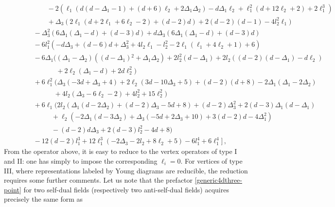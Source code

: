 \documentclass{article}
\begin{document}
\begin{eqnarray*}
&&\qquad \qquad \,\,-2 \left(\ell _1 \left(d \left(d-\Delta _1-1\right)+(d+6) \ell _2+2 \Delta _1 \Delta _2\right)-d \Delta _1 \ell _2+\ell _1^2 \left(d+12 \ell _2+2\right)+2 \ell _1^3\right)\\
&&\qquad \qquad\,\,+\Delta _3 \left(2 \ell _1 \left(d+2 \ell _1+6 \ell _2-2\right)+(d-2) d\right)+2 (d-2) (d-1)-4 l_2^2 \ell _1\bigr)\\
&&\qquad \,\, -\Delta _3^2 \left(6 \Delta _1 \left(\Delta _1-d\right)+(d-3) d\right)+d \Delta _3 \left(6 \Delta _1 \left(\Delta _1-d\right)+(d-3) d\right)\\
&&\qquad\,\, -6 l_1^2 \left(-d \Delta _3+(d-6) d+\Delta _3^2+4 l_2 \ell _1-l_2^2-2 \ell _1 \left(\ell _1+4 \ell _2+1\right)+6\right)\\
&&\qquad\,\,-6 \Delta _1 \bigl(\left(\Delta _1-\Delta _2\right) \left(\left(d-\Delta _1\right){}^2+\Delta _1 \Delta _2\right)+2 l_2^2 \left(d-\Delta _1\right)+2 l_2 \left((d-2) \left(d-\Delta _1\right)-d \ell _2\right)\\
    &&\qquad \qquad\quad\,\,\,\, +2 \ell _2 \left(\Delta _1-d\right)+2 d \ell _2^2\bigr)\\
&&\qquad\,\, +6 \ell _1^2 \bigl(\Delta _3 \left(-3 d+\Delta _3+4\right)+2 \ell _2 \left(3 d-10 \Delta _3+5\right)+(d-2) (d+8)-2 \Delta _1 \left(\Delta _1-2 \Delta _2\right)\\
    &&\qquad\qquad \quad\,\, +4 l_2 \left(\Delta _3-6 \ell _2-2\right)+4 l_2^2+15 \ell _2^2\bigr)\\
&&\qquad\,\, +6 \ell _1 \bigl(2 l_2 \left(\Delta _1 \left(d-2 \Delta _2\right)+(d-2) \Delta _3-5 d+8\right)+(d-2) \Delta _3^2+2 (d-3) \Delta _1 \left(d-\Delta _1\right)\\
&&\qquad \qquad \quad  +\ell _2 \left(-2 \Delta _1 \left(d-3 \Delta _2\right)+\Delta _3 \left(-5 d+2 \Delta _3+10\right)+3 (d-2) d-4 \Delta _1^2\right)\\
&& \qquad \qquad \quad -(d-2) d \Delta _3+2 (d-3) l_2^2-4 d+8\bigr)\\
&&\qquad\,\, -12 (d-2) l_1^3+12 \ell _1^3 \left(-2 \Delta _3-2 l_2+8 \ell _2+5\right)-6 l_1^4+6 \ell _1^4\bigr]\,,
\end{eqnarray*}
From the operator above, it is easy to reduce to the vertex operators of type I and II: 
one has simply to impose the corresponding $\ell_i=0$. For vertices of type III, where
representations labeled by Young diagrams are reducible, the reduction requires some
further comments. Let us note that the prefactor \eqref{generic4dthree-point} for two
self-dual fields (respectively two anti-self-dual fields) acquires precisely the same form as 
\end{document}

